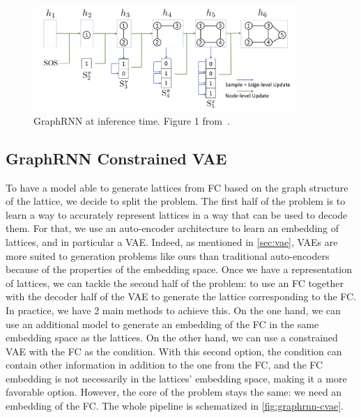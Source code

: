 \begin{figure}
    \centering
    \includegraphics[keepaspectratio, width=.9\textwidth, height=4cm]{Figures/Ch1/graphrnn.png}
    \caption{GraphRNN at inference time. Figure 1 from~\cite{graphrnn:2018:jiaxuan}.}
    \label{fig:graphrnn}
\end{figure}

\subsection{GraphRNN Constrained VAE\label{sec:graph-model-full}}

To have a model able to generate lattices from FC based on the graph structure of the lattice, we decide to split the problem.
The first half of the problem is to learn a way to accurately represent lattices in a way that can be used to decode them.
For that, we use an auto-encoder architecture to learn an embedding of lattices, and in particular a VAE.
Indeed, as mentioned in \cref{sec:vae}, VAEs are more suited to generation problems like ours than traditional auto-encoders because of the properties of the embedding space.
Once we have a representation of lattices, we can tackle the second half of the problem: to use an FC together with the decoder half of the VAE to generate the lattice corresponding to the FC.
In practice, we have 2 main methods to achieve this.
On the one hand, we can use an additional model to generate an embedding of the FC in the same embedding space as the lattices.
On the other hand, we can use a constrained VAE with the FC as the condition.
With this second option, the condition can contain other information in addition to the one from the FC, and the FC embedding is not necessarily in the lattices' embedding space, making it a more favorable option. However, the core of the problem stays the same: we need an embedding of the FC.
The whole pipeline is schematized in \cref{fig:graphrnn-cvae}.

